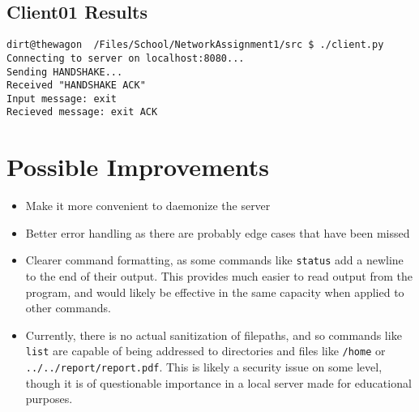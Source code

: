 \documentclass{article}
\begin{document}
\subsection{Client01 Results}
\texttt{dirt@thewagon ~/Files/School/NetworkAssignment1/src \$ ./client.py \\
Connecting to server on localhost:8080...\\
Sending HANDSHAKE...\\
Received "HANDSHAKE ACK"\\
Input message: exit\\
Recieved message: exit ACK}

\section{Possible Improvements}
\begin{itemize}
	\item Make it more convenient to daemonize the server
	\item Better error handling as there are probably edge cases that have been missed
	\item Clearer command formatting, as some commands like \texttt{status} add a newline to the end of their output. This provides much easier to read output from the program, and would likely be effective in the same capacity when applied to other commands.
	\item Currently, there is no actual sanitization of filepaths, and so commands like \texttt{list} are capable of being addressed to directories and files like \texttt{/home} or \texttt{../../report/report.pdf}. This is likely a security issue on some level, though it is of questionable importance in a local server made for educational purposes.
\end{itemize}
\end{document}
